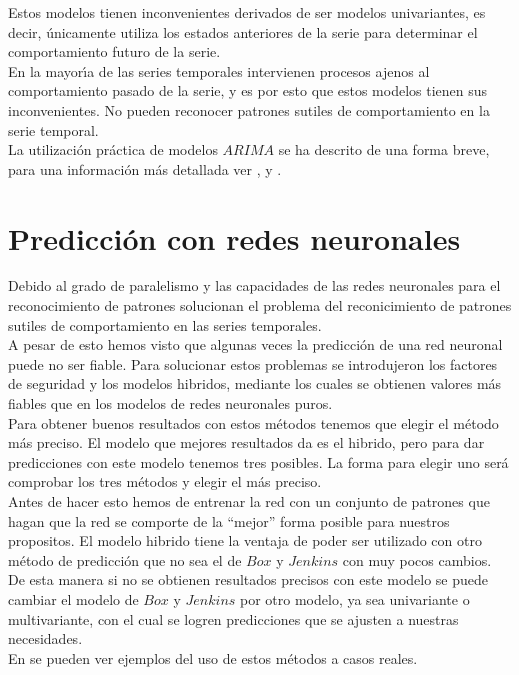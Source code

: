 Estos modelos tienen inconvenientes derivados de ser modelos univariantes, es 
decir, \'unicamente utiliza los estados anteriores de la serie para determinar
el comportamiento futuro de la serie.\\

En la mayor\'{\i}a de las series temporales intervienen procesos ajenos al
comportamiento pasado de la serie, y es por esto que estos modelos tienen sus
inconvenientes. No pueden reconocer patrones sutiles de comportamiento en la
serie temporal.\\

La utilizaci\'on pr\'actica de modelos $ARIMA$ se ha descrito de una forma
breve, para una informaci\'on m\'as detallada ver \cite{Daniel},
\cite{econometria} y \cite{modeconometricos}.

\section{Predicci\'on con redes neuronales}

Debido al grado de paralelismo y las capacidades de las redes neuronales para
el reconocimiento de patrones solucionan el problema del reconicimiento de
patrones sutiles de comportamiento en las series temporales.\\

A pesar de esto hemos visto que algunas veces la predicci\'on de una red
neuronal puede no ser fiable. Para solucionar estos problemas se introdujeron
los factores de seguridad y los modelos hibridos, mediante los cuales se
obtienen valores m\'as fiables que en los modelos de redes neuronales puros.\\

Para obtener buenos resultados con estos m\'etodos tenemos que elegir el
m\'etodo m\'as preciso. El modelo que mejores resultados da es el hibrido,
pero para dar predicciones con este modelo tenemos tres posibles. La forma 
para elegir uno ser\'a comprobar los tres m\'etodos y elegir el m\'as preciso.\\

Antes de hacer esto hemos de entrenar la red con un conjunto de patrones que
hagan que la red se comporte de la ``mejor'' forma posible para nuestros
propositos.
%
\newpage
%
El modelo hibrido tiene la ventaja de poder ser utilizado con otro m\'etodo
de predicci\'on que no sea el de $Box$ y $Jenkins$ con muy pocos cambios. De
esta manera si no se obtienen resultados precisos con este modelo se puede 
cambiar el modelo de $Box$ y $Jenkins$ por otro modelo, ya sea univariante o
multivariante, con el cual se logren predicciones que se ajusten a nuestras
necesidades.\\

En \cite{RBF} se pueden ver ejemplos del uso de estos m\'etodos a casos reales.
